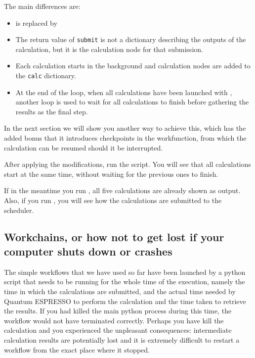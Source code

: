 The main differences are:
\begin{itemize}
 \item {} is replaced by 
 \item The return value of \texttt{submit} is not a dictionary describing the outputs of the calculation, but it is the calculation node for that submission.
 \item Each calculation starts in the background and calculation nodes are added to the \texttt{calc} dictionary.
 \item At the end of the loop, when all calculations have been launched with , another loop is used to wait for all calculations to finish before gathering the results as the final step.
 
\end{itemize}
In the next section we will show you another way to achieve this, which has the added bonus that it introduces checkpoints in the workfunction, from which the calculation can be resumed should it be interrupted.

\begin{tcolorbox}
After applying the modifications, run the script. You will see that all calculations start at the same time, without waiting for the previous ones to finish.
\end{tcolorbox}
If in the meantime you run , all five calculations are already shown as output. Also, if you run , you will see how the calculations are submitted to the scheduler.


\subsection{\label{sec:workchainsimple}Workchains, or how not to get lost if your computer shuts down or crashes}
The simple workflows that we have used so far have been launched by a python script that needs to be running for the whole time of the execution, namely the time in which the calculations are submitted, and the actual time needed by Quantum ESPRESSO to perform the calculation and the time taken to retrieve the results. 
If you had killed the main python process during this time, the workflow would not have terminated correctly.  Perhaps you have kill the calculation and you experienced the unpleasant consequences: intermediate calculation results are potentially lost and it is extremely difficult to restart a workflow from the exact place where it stopped.

